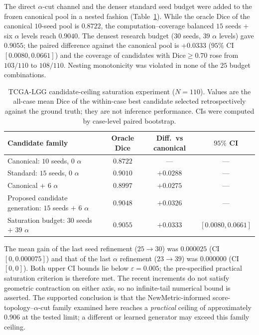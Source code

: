 \documentclass[11pt,a4paper]{article}
\begin{document}
The direct $\alpha$-cut channel and the denser standard seed budget were added to
the frozen canonical pool in a nested fashion (Table~\ref{tab:saturation}). While
the oracle Dice of the canonical $10$-seed pool is $0.8722$, the
computation--coverage balanced $15$ seeds $+$ six $\alpha$ levels reach $0.9040$.
The densest research budget ($30$ seeds, $39$ $\alpha$ levels) gave $0.9055$; the
paired difference against the canonical pool is $+0.0333$ ($95\%$ CI
$[0.0080,0.0661]$) and the coverage of candidates with Dice$\ge0.70$ rose from
$103/110$ to $108/110$. Nesting monotonicity was violated in none of the $25$ budget
combinations.
\begin{table}[htbp!]\centering
\caption{TCGA-LGG candidate-ceiling saturation experiment ($N=110$). Values are the all-case mean Dice of the within-case best candidate selected retrospectively against the ground truth; they are not inference performance. CIs were computed by case-level paired bootstrap.}
\label{tab:saturation}
\begin{tabular}{lccc}
\toprule
Candidate family & Oracle Dice & Diff.\ vs canonical & $95\%$ CI \\
\midrule
Canonical: $10$ seeds, $0$ $\alpha$ & $0.8722$ & --- & --- \\
Standard: $15$ seeds, $0$ $\alpha$ & $0.9010$ & $+0.0288$ & --- \\
Canonical $+$ $6$ $\alpha$ & $0.8997$ & $+0.0275$ & --- \\
Proposed candidate generation: $15$ seeds $+$ $6$ $\alpha$ & $0.9048$ & $+0.0326$ & --- \\
Saturation budget: $30$ seeds $+$ $39$ $\alpha$ & $\mathbf{0.9055}$ & $\mathbf{+0.0333}$ & $\mathbf{[0.0080,0.0661]}$ \\
\bottomrule
\end{tabular}
\end{table}
The mean gain of the last seed refinement ($25\to30$) was $0.000025$ (CI
$[0,0.000075]$) and that of the last $\alpha$ refinement ($23\to39$) was
$0.000000$ (CI $[0,0]$). Both upper CI bounds lie below
$\varepsilon=0.005$; the pre-specified practical saturation criterion is therefore met. The recent increments do not satisfy geometric contraction on either axis, so no infinite-tail numerical bound is asserted. The supported conclusion is that the NewMetric-informed score-topology--$\alpha$-cut family examined here reaches a \emph{practical} ceiling of approximately $0.906$ at the tested limit; a different or learned generator may exceed this family ceiling.
\end{document}
